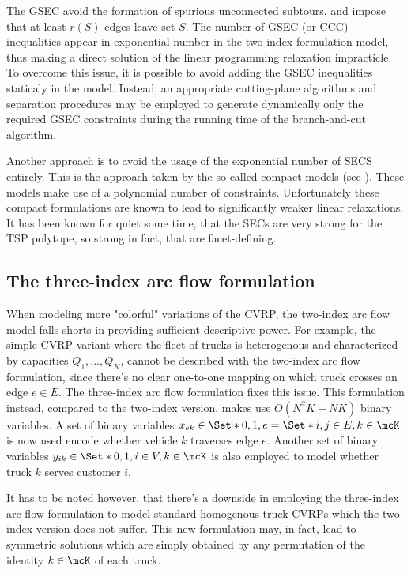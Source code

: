 The GSEC avoid the formation of spurious unconnected subtours, and impose that at least $r(S)$ edges leave set $S$.
The number of GSEC (or CCC) inequalities appear in exponential number in the two-index formulation model,
thus making a direct solution of the linear programming relaxation impracticle.
To overcome this issue, it is possible to avoid adding the GSEC inequalities staticaly in the model.
Instead, an appropriate cutting-plane algorithms and separation procedures may be employed to generate dynamically only the required
GSEC constraints during the running time of the branch-and-cut algorithm.

Another approach is to avoid the usage of the exponential number of SECS entirely.
This is the approach taken by the so-called compact models (see \cite{miller1960, christofides1979, desrochers1991}).
These models make use of a polynomial number of constraints.
Unfortunately these compact formulations are known to lead to significantly weaker linear relaxations.
It has been known for quiet some time, that the SECs are very strong for the TSP polytope, so strong in fact, that are facet-defining.


\subsection{The three-index arc flow formulation}
\label{sec:intro-cvrp-three-index-flow-formulation}

When modeling more "colorful" variations of the CVRP, the two-index arc flow model falls shorts in providing sufficient descriptive power.
For example, the simple CVRP variant where the fleet of trucks is heterogenous and characterized by capacities $Q_1, \dots, Q_K$,
cannot be described with the two-index arc flow formulation, since there's no clear one-to-one mapping on which truck crosses an edge $e \in E$.
The three-index arc flow formulation fixes this issue.
This formulation instead, compared to the two-index version, makes use $O(N^2 K + N K)$ binary variables.
A set of binary variables $x_{ek} \in \Set*{0, 1}, e = \Set*{i, j} \in E, k \in \mcK$ is now used encode whether vehicle $k$ traverses edge $e$.
Another set of binary variables $y_{ik} \in \Set*{0, 1}, i \in V, k \in \mcK$ is also employed to model whether truck $k$ serves customer $i$.

It has to be noted however, that there's a downside in employing the three-index arc flow formulation to model standard homogenous truck CVRPs which the two-index version does not suffer.
This new formulation may, in fact, lead to symmetric solutions which are simply obtained by any permutation of the identity $k \in \mcK$ of each truck.

